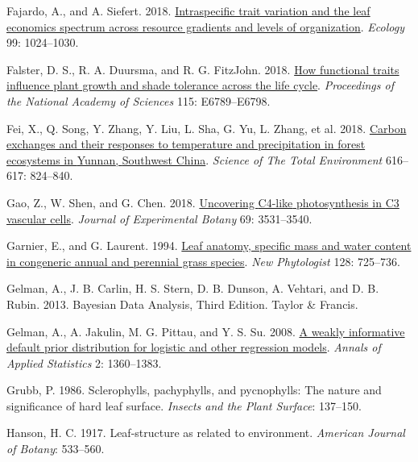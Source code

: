 \documentclass[
  12pt,
  a4paper,
,tablecaptionabove
]{scrartcl}
\newlength{\cslhangindent}
\newenvironment{CSLReferences}[2] %
 {%
  \setlength{\parindent}{0pt}
  \ifodd #1 \everypar{\setlength{\hangindent}{\cslhangindent}}\ignorespaces\fi
  \ifnum #2 > 0
  \setlength{\parskip}{#2\baselineskip}
  \fi
 }%
 {}
\begin{document}
\begin{CSLReferences}{1}{0}
\leavevmode{}%
Fajardo, A., and A. Siefert. 2018. \href{https://doi.org/10.1002/ecy.2194}{Intraspecific trait variation and the leaf economics spectrum across resource gradients and levels of organization}. \emph{Ecology} 99: 1024--1030.

\leavevmode{}%
Falster, D. S., R. A. Duursma, and R. G. FitzJohn. 2018. \href{https://doi.org/10.1073/pnas.1714044115}{How functional traits influence plant growth and shade tolerance across the life cycle}. \emph{Proceedings of the National Academy of Sciences} 115: E6789--E6798.

\leavevmode{}%
Fei, X., Q. Song, Y. Zhang, Y. Liu, L. Sha, G. Yu, L. Zhang, et al. 2018. \href{https://doi.org/10.1016/j.scitotenv.2017.10.239}{Carbon exchanges and their responses to temperature and precipitation in forest ecosystems in {Yunnan}, {Southwest China}}. \emph{Science of The Total Environment} 616--617: 824--840.

\leavevmode{}%
Gao, Z., W. Shen, and G. Chen. 2018. \href{https://doi.org/10.1093/jxb/ery155}{Uncovering {C4-like} photosynthesis in {C3} vascular cells}. \emph{Journal of Experimental Botany} 69: 3531--3540.

\leavevmode{}%
Garnier, E., and G. Laurent. 1994. \href{https://doi.org/10.1111/j.1469-8137.1994.tb04036.x}{Leaf anatomy, specific mass and water content in congeneric annual and perennial grass species}. \emph{New Phytologist} 128: 725--736.

\leavevmode{}%
Gelman, A., J. B. Carlin, H. S. Stern, D. B. Dunson, A. Vehtari, and D. B. Rubin. 2013. Bayesian {Data Analysis}, {Third Edition}. {Taylor \& Francis}.

\leavevmode{}%
Gelman, A., A. Jakulin, M. G. Pittau, and Y. S. Su. 2008. \href{https://doi.org/10.1214/08-AOAS191}{A weakly informative default prior distribution for logistic and other regression models}. \emph{Annals of Applied Statistics} 2: 1360--1383.

\leavevmode{}%
Grubb, P. 1986. Sclerophylls, pachyphylls, and pycnophylls: {The} nature and significance of hard leaf surface. \emph{Insects and the Plant Surface}: 137--150.

\leavevmode{}%
Hanson, H. C. 1917. Leaf-structure as related to environment. \emph{American Journal of Botany}: 533--560.


\end{CSLReferences}
\end{document}
